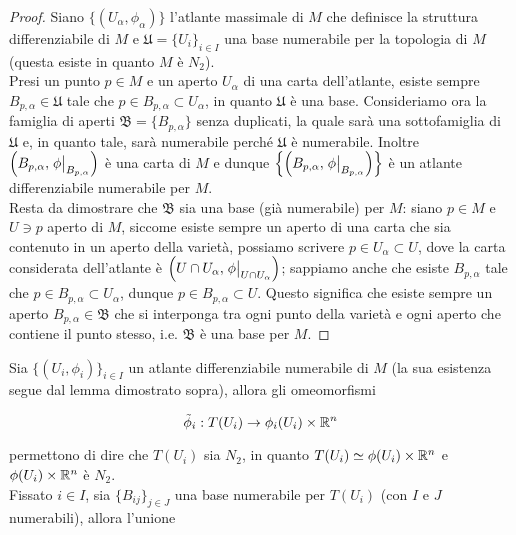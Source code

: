 \begin{proof}
	Siano $ \{(U_{\alpha},\phi_{\alpha})\} $ l'atlante massimale di $ M $ che definisce la struttura differenziabile di $ M $ e $ \mathfrak{U} = \{U_{i}\}_{i \in I} $ una base numerabile per la topologia di $ M $ (questa esiste in quanto $ M $ è $ N_{2} $).\\
	Presi un punto $ p \in M $ e un aperto $ U_{\alpha} $ di una carta dell'atlante, esiste sempre $ B_{p,\alpha} \in \mathfrak{U} $ tale che $ p \in B_{p,\alpha} \subset U_{\alpha} $, in quanto $ \mathfrak{U} $ è una base. Consideriamo ora la famiglia di aperti $ \mathfrak{B} = \{B_{p,\alpha}\} $ senza duplicati, la quale sarà una sottofamiglia di $ \mathfrak{U} $ e, in quanto tale, sarà numerabile perché $ \mathfrak{U} $ è numerabile. Inoltre $ \left( B_{p,\alpha}, \eval{\phi}_{B_{p,\alpha}} \right) $ è una carta di $ M $ e dunque $ \left\{ \left( B_{p,\alpha}, \eval{\phi}_{B_{p,\alpha}} \right) \right\} $ è un atlante differenziabile numerabile per $ M $.\\
	Resta da dimostrare che $ \mathfrak{B} $ sia una base (già numerabile) per $ M $: siano $ p \in M $ e $ U \ni p $ aperto di $ M $, siccome esiste sempre un aperto di una carta che sia contenuto in un aperto della varietà, possiamo scrivere $ p \in U_{\alpha} \subset U $, dove la carta considerata dell'atlante è $ \left( U \cap U_{\alpha}, \eval{\phi}_{U \cap U_{\alpha}} \right) $; sappiamo anche che esiste $ B_{p,\alpha} $ tale che $ p \in B_{p,\alpha} \subset U_{\alpha} $, dunque $ p \in B_{p,\alpha} \subset U $. Questo significa che esiste sempre un aperto $ B_{p,\alpha} \in \mathfrak{B} $ che si interponga tra ogni punto della varietà e ogni aperto che contiene il punto stesso, i.e. $ \mathfrak{B} $ è una base per $ M $.
\end{proof}

Sia $ \{(U_{i},\phi_{i})\}_{i \in I} $ un atlante differenziabile numerabile di $ M $ (la sua esistenza segue dal lemma dimostrato sopra), allora gli omeomorfismi

\begin{equation}
	\tilde{\phi}_{i} : T(U_{i}) \to \phi_{i}(U_{i}) \times \mathbb{R}^{n}
\end{equation}

permettono di dire che $ T(U_{i}) $ sia $ N_{2} $, in quanto $ T(U_{i}) \simeq \phi(U_{i}) \times \mathbb{R}^{n} $ e $ \phi(U_{i}) \times \mathbb{R}^{n} $ è $ N_{2} $.\\
Fissato $ i \in I $, sia $ \{B_{ij}\}_{j \in J} $ una base numerabile per $ T(U_{i}) $ (con $ I $ e $ J $ numerabili), allora l'unione

